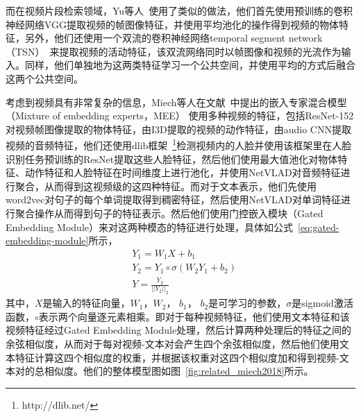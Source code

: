 而在视频片段检索领域，Yu等人~\cite{vsrel2020}使用了类似的做法，他们首先使用预训练的卷积神经网络VGG提取视频的帧图像特征，并使用平均池化的操作得到视频的物体特征，另外，他们还使用一个双流的卷积神经网络temporal segment network（TSN）~\cite{wang2016temporal}来提取视频的活动特征，该双流网络同时以帧图像和视频的光流作为输入。同样，他们单独地为这两类特征学习一个公共空间，并使用平均的方式后融合这两个公共空间。

考虑到视频具有非常复杂的信息，Miech等人在文献~\cite{miech2018learning}中提出的嵌入专家混合模型（Mixture of embedding experts，MEE） 使用多种视频的特征，包括ResNet-152对视频帧图像提取的物体特征，由I3D提取的视频的动作特征，由audio CNN提取视频的音频特征，他们还使用dlib框架~\footnote{http://dlib.net/}检测视频内的人脸并使用该框架里在人脸识别任务预训练的ResNet提取这些人脸特征，然后他们使用最大值池化对物体特征、动作特征和人脸特征在时间维度上进行池化，并使用NetVLAD对音频特征进行聚合，从而得到这视频级的这四种特征。而对于文本表示，他们先使用word2vec对句子的每个单词提取得到稠密特征，然后使用NetVLAD对单词特征进行聚合操作从而得到句子的特征表示。然后他们使用门控嵌入模块（Gated Embedding Module）来对这两种模态的特征进行处理，具体如公式~\ref{eq:gated-embedding-module}所示，
\begin{equation}
    \label{eq:gated-embedding-module}
    \begin{aligned}
        & Y_1 = W_1 X + b_1 \\
        & Y_2 = Y_1 \circ \sigma(W_2Y_1 + b_2) \\
        & Y = \frac{Y_2}{||Y_2||_2}
    \end{aligned}
\end{equation}
其中，$X$是输入的特征向量，$W_1$，$W_2$， $b_1$， $b_2$是可学习的参数，$\sigma$是sigmoid激活函数，$\circ$表示两个向量逐元素相乘。即对于每种视频特征，他们使用文本特征和该视频特征经过Gated Embedding Module处理，然后计算两种处理后的特征之间的余弦相似度，从而对于每对视频-文本对会产生四个余弦相似度，然后他们使用文本特征计算这四个相似度的权重，并根据该权重对这四个相似度加和得到视频-文本对的总相似度。他们的整体模型图如图~\ref{fig:related_miech2018}所示。

